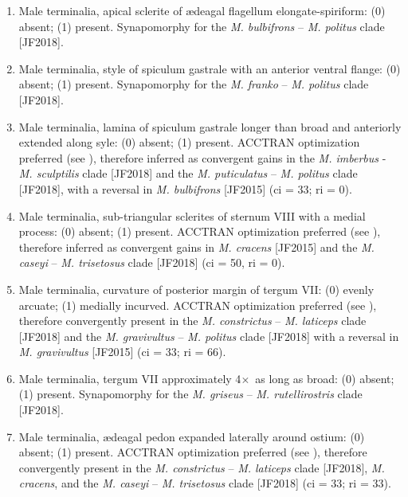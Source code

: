 \documentclass[fleqn,10pt,lineno]{wlpeerj} %
\newcommand{\x}{$\times$~}
\begin{document}
\begin{enumerate}
		\item Male terminalia, apical sclerite of {\ae}deagal flagellum elongate-spiriform: (0) absent; (1) present. Synapomorphy for the \textit{M. bulbifrons} – \textit{M. politus} clade [JF2018].
		
		\item Male terminalia, style of spiculum gastrale with an anterior ventral flange: (0) absent; (1) present. Synapomorphy for the \textit{M. franko} – \textit{M. politus} clade [JF2018].
		
		\item Male terminalia, lamina of spiculum gastrale longer than broad and anteriorly extended along syle: (0) absent; (1) present. ACCTRAN optimization preferred (see \citealt{agnarsson2008}), therefore inferred as convergent gains in the \textit{M. imberbus} - \textit{M. sculptilis} clade [JF2018] and the \textit{M. puticulatus} – \textit{M. politus} clade [JF2018], with a reversal in \textit{M. bulbifrons} [JF2015] (ci = 33; ri = 0).
		
		\item Male terminalia, sub-triangular sclerites of sternum VIII with a medial process: (0) absent; (1) present. ACCTRAN optimization preferred (see \citealt{agnarsson2008}), therefore inferred as convergent gains in \textit{M. cracens} [JF2015] and the \textit{M. caseyi} – \textit{M. trisetosus} clade [JF2018] (ci = 50, ri = 0).
		
		\item Male terminalia, curvature of posterior margin of tergum VII: (0) evenly arcuate; (1) medially incurved. ACCTRAN optimization preferred (see \citealt{agnarsson2008}), therefore convergently present in the \textit{M. constrictus} – \textit{M. laticeps} clade [JF2018] and the \textit{M. gravivultus} – \textit{M. politus} clade [JF2018] with a reversal in \textit{M. gravivultus} [JF2015] (ci = 33; ri = 66).
		
		\item Male terminalia, tergum VII approximately 4\x as long as broad: (0) absent; (1) present. Synapomorphy for the \textit{M. griseus} – \textit{M. rutellirostris} clade [JF2018].
		
		\item Male terminalia, {\ae}deagal pedon expanded laterally around ostium: (0) absent; (1) present. ACCTRAN optimization preferred (see \citealt{agnarsson2008}), therefore convergently present in the \textit{M. constrictus} – \textit{M. laticeps} clade [JF2018], \textit{M. cracens}, and the \textit{M. caseyi} –\textit{ M. trisetosus} clade [JF2018] (ci = 33; ri = 33).
		

\end{enumerate}
\end{document}

